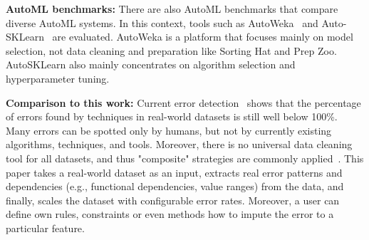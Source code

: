 \textbf{AutoML benchmarks:} 
There are also AutoML benchmarks that compare diverse AutoML systems.
In this context, tools such as AutoWeka~\cite{autoweka} and Auto-SKLearn~\cite{autosklearn} are evaluated.
AutoWeka is a platform that focuses mainly on model selection, not data cleaning and preparation like Sorting Hat and Prep Zoo.
AutoSKLearn also mainly concentrates on algorithm selection and hyperparameter tuning.

\textbf{Comparison to this work:} 
Current error detection~\cite{errors, cleanml} shows that the percentage of errors found by techniques in real-world datasets is still well below 100\%. 
Many errors can be spotted only by humans, but not by currently existing algorithms, techniques, and tools.
Moreover, there is no universal data cleaning tool for all datasets, and thus "composite" strategies are commonly applied~\cite{errors}.
This paper takes a real-world dataset as an input, extracts real error patterns and dependencies (e.g., functional dependencies, value ranges) from the data, and finally, scales the dataset with configurable error rates. 
Moreover, a user can define own rules, constraints or even methods how to impute the error to a particular feature.





